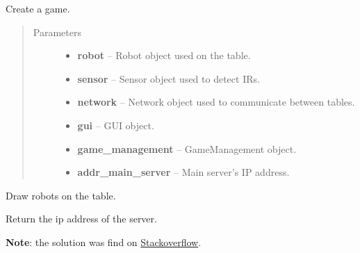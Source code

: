 \documentclass[letterpaper,10pt,english]{sphinxmanual}
\begin{document}
\begin{fulllineitems}
\label{api:game.Game}
Create a game.
\begin{quote}\begin{description}
\item[{Parameters}] \leavevmode\begin{itemize}
\item {} 
\textbf{robot} -- Robot object used on the table.

\item {} 
\textbf{sensor} -- Sensor object used to detect IRs.

\item {} 
\textbf{network} -- Network object used to communicate between tables.

\item {} 
\textbf{gui} -- GUI object.

\item {} 
\textbf{game\_management} -- GameManagement object.

\item {} 
\textbf{addr\_main\_server} -- Main server's IP address.

\end{itemize}

\end{description}\end{quote}

\begin{fulllineitems}
\label{api:game.Game.draw_robots}
Draw robots on the table.

\end{fulllineitems}


\begin{fulllineitems}
\label{api:game.Game.get_addr}
Return the ip address of the server.

\textbf{Note}: the solution was find on \href{http://goo.gl/D6FKrq}{Stackoverflow}.

\end{fulllineitems}



\end{fulllineitems}
\end{document}
